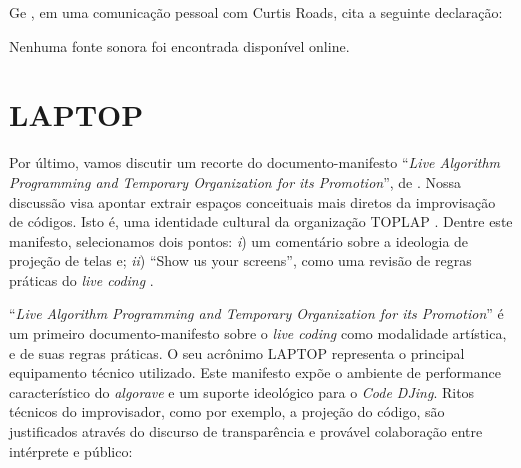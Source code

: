 Ge , em uma comunicação pessoal com Curtis Roads, cita a seguinte declaração: 

Nenhuma fonte sonora foi encontrada disponível online. 

\section{LAPTOP}\label{sec:laptoptoplap}

Por último, vamos discutir um recorte do documento-manifesto ``\emph{Live Algorithm Programming and Temporary Organization for its Promotion}'', de . Nossa discussão visa apontar extrair espaços conceituais mais diretos da improvisação de códigos. Isto é, uma identidade cultural da organização TOPLAP .  Dentre este manifesto, selecionamos dois pontos: \emph{i}) um comentário sobre a ideologia de projeção de telas  e; \emph{ii}) ``Show us your screens'', como uma revisão de regras práticas do \emph{live coding} .

``\emph{Live Algorithm Programming and Temporary Organization for its Promotion}'' \cite{ward_live_2004,blackwell_programming_2005} é um primeiro documento-manifesto sobre o \emph{live coding} como modalidade artística, e de suas regras práticas. O seu acrônimo LAPTOP representa o principal equipamento técnico utilizado. Este manifesto expõe o ambiente de performance característico do \emph{algorave} e um suporte ideológico para o \emph{Code DJing}. Ritos técnicos do improvisador, como por exemplo, a projeção do código, são justificados através do discurso de transparência e provável colaboração entre intérprete e público:

